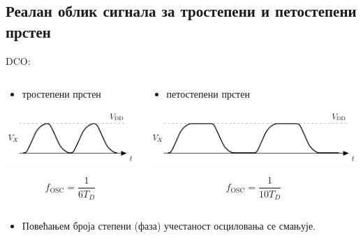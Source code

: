 \documentclass[aspectratio=169]{beamer}
\def \DCO  {DCO} %
\begin{document}
\subsection{Реалан облик сигнала за тростепени и петостепени прстен}
\begin{frame}{\DCO: \subsecname}
    \begin{columns}[t]
        \begin{column}{0.5\linewidth}
		\begin{itemize}
		    \item тростепени прстен
		\end{itemize}
		\medskip
        	\begin{center}
	            \includegraphics[scale=0.6]{slike/prezentacija/inv_ring_osc_3_1.pdf} 
	        \end{center}
		\begin{equation}
	   	    f_\text{OSC} = \frac{1}{6T_D} \nonumber
		\end{equation}
        \end{column}
        \begin{column}{0.5\linewidth}
		\begin{itemize}
		    \item петостепени прстен
		\end{itemize}
		\medskip
        	\begin{center}
            	    \includegraphics[scale=0.6]{slike/prezentacija/inv_ring_osc_3_2.pdf}
                \end{center}
		\begin{equation}
	   	    f_\text{OSC} = \frac{1}{10T_D} \nonumber
		\end{equation}
        \end{column}
    \end{columns}
    \bigskip
    \vspace{0.5cm}
    \begin{itemize}
	\item Повећањем броја степени (фаза) учестаност осциловања се смањује.
    \end{itemize}
\end{frame}
\end{document}
